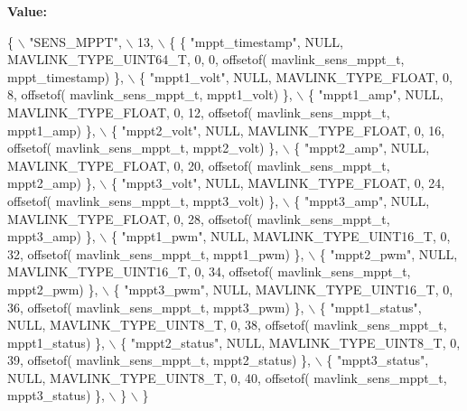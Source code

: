 {\bfseries Value\+:}
\begin{DoxyCode}
\{ \(\backslash\)
    \textcolor{stringliteral}{"SENS\_MPPT"}, \(\backslash\)
    13, \(\backslash\)
    \{  \{ \textcolor{stringliteral}{"mppt\_timestamp"}, NULL, MAVLINK_TYPE_UINT64_T, 0, 0, offsetof(
      mavlink_sens_mppt_t, mppt\_timestamp) \}, \(\backslash\)
         \{ \textcolor{stringliteral}{"mppt1\_volt"}, NULL, MAVLINK_TYPE_FLOAT, 0, 8, offsetof(
      mavlink_sens_mppt_t, mppt1\_volt) \}, \(\backslash\)
         \{ \textcolor{stringliteral}{"mppt1\_amp"}, NULL, MAVLINK_TYPE_FLOAT, 0, 12, offsetof(
      mavlink_sens_mppt_t, mppt1\_amp) \}, \(\backslash\)
         \{ \textcolor{stringliteral}{"mppt2\_volt"}, NULL, MAVLINK_TYPE_FLOAT, 0, 16, offsetof(
      mavlink_sens_mppt_t, mppt2\_volt) \}, \(\backslash\)
         \{ \textcolor{stringliteral}{"mppt2\_amp"}, NULL, MAVLINK_TYPE_FLOAT, 0, 20, offsetof(
      mavlink_sens_mppt_t, mppt2\_amp) \}, \(\backslash\)
         \{ \textcolor{stringliteral}{"mppt3\_volt"}, NULL, MAVLINK_TYPE_FLOAT, 0, 24, offsetof(
      mavlink_sens_mppt_t, mppt3\_volt) \}, \(\backslash\)
         \{ \textcolor{stringliteral}{"mppt3\_amp"}, NULL, MAVLINK_TYPE_FLOAT, 0, 28, offsetof(
      mavlink_sens_mppt_t, mppt3\_amp) \}, \(\backslash\)
         \{ \textcolor{stringliteral}{"mppt1\_pwm"}, NULL, MAVLINK_TYPE_UINT16_T, 0, 32, offsetof(
      mavlink_sens_mppt_t, mppt1\_pwm) \}, \(\backslash\)
         \{ \textcolor{stringliteral}{"mppt2\_pwm"}, NULL, MAVLINK_TYPE_UINT16_T, 0, 34, offsetof(
      mavlink_sens_mppt_t, mppt2\_pwm) \}, \(\backslash\)
         \{ \textcolor{stringliteral}{"mppt3\_pwm"}, NULL, MAVLINK_TYPE_UINT16_T, 0, 36, offsetof(
      mavlink_sens_mppt_t, mppt3\_pwm) \}, \(\backslash\)
         \{ \textcolor{stringliteral}{"mppt1\_status"}, NULL, MAVLINK_TYPE_UINT8_T, 0, 38, offsetof(
      mavlink_sens_mppt_t, mppt1\_status) \}, \(\backslash\)
         \{ \textcolor{stringliteral}{"mppt2\_status"}, NULL, MAVLINK_TYPE_UINT8_T, 0, 39, offsetof(
      mavlink_sens_mppt_t, mppt2\_status) \}, \(\backslash\)
         \{ \textcolor{stringliteral}{"mppt3\_status"}, NULL, MAVLINK_TYPE_UINT8_T, 0, 40, offsetof(
      mavlink_sens_mppt_t, mppt3\_status) \}, \(\backslash\)
         \} \(\backslash\)
\}
\end{DoxyCode}
\mbox{\label{mavlink__msg__sens__mppt_8h_ae7d99034d03f3b26d1c999e011e31397}} 

